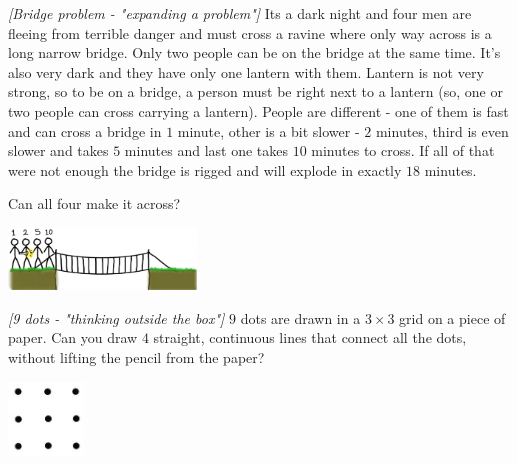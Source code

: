 
%
%


\renewcommand{\theenumi}{\alph{enumi}}


\noindent 

\begin{problem}
\textit{[Bridge problem - "expanding a problem"]}
Its a dark night and four men are fleeing from terrible danger and must cross a ravine where only way across is a long narrow bridge. Only two people can be on the bridge at the same time. It's also very dark and they have only one lantern with them. Lantern is not very strong, so to be on a bridge, a person must be right next to a lantern (so, one or two people can cross carrying a lantern). 
People are different - one of them is fast and can cross a bridge in $1$ minute, other is a bit slower - $2$ minutes, third is even slower and takes $5$ minutes and last one takes $10$ minutes to cross.
If all of that were not enough the bridge is rigged and will explode in exactly $18$ minutes. 

Can all four make it across?
\begin{center}
\includegraphics[width=5cm]{bridge.jpg}
\label{fig:bridge}
\end{center}
\end{problem}
%

\begin{problem}
\textit{[9 dots - "thinking outside the box"]}
$9$ dots are drawn in a $3 \times 3$ grid on a piece of paper. Can you draw $4$ straight, continuous lines that connect all the dots, without lifting the pencil from the paper?
\begin{center}
\includegraphics[width=2cm]{3by3.jpg}
\label{fig:bridge}
\end{center}
\end{problem}
%

